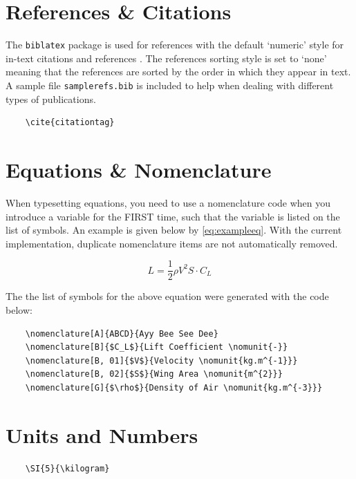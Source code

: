 \section{References \& Citations}
The \texttt{biblatex} package is used for references with the default `numeric'
style for in-text citations and references \cite{sampleref}. The references
sorting style is set to `none' meaning that the references are sorted by the
order in which they appear in text. A sample file \texttt{samplerefs.bib} is
included to help when dealing with different types of publications.

\begin{verbatim}
    \cite{citationtag}
\end{verbatim}

\section{Equations \& Nomenclature}
When typesetting equations, you need to use a nomenclature code when you 
introduce a variable for the FIRST time, such that the variable is listed on 
the list of symbols. An example is given below by \cref{eq:exampleeq}. With the
current implementation, duplicate nomenclature items are not automatically 
removed.

\begin{equation}
\label{eq:exampleeq}
    L = \frac{1}{2}\rho V^2 S \cdot C_{L}
\end{equation}


The the list of symbols for the above equation were generated with the code 
below:

\begin{verbatim}
    \nomenclature[A]{ABCD}{Ayy Bee See Dee}
    \nomenclature[B]{$C_L$}{Lift Coefficient \nomunit{-}}
    \nomenclature[B, 01]{$V$}{Velocity \nomunit{kg.m^{-1}}}
    \nomenclature[B, 02]{$S$}{Wing Area \nomunit{m^{2}}}
    \nomenclature[G]{$\rho$}{Density of Air \nomunit{kg.m^{-3}}}
\end{verbatim}


\section{Units and Numbers}
\begin{verbatim}
    \SI{5}{\kilogram}
\end{verbatim}




